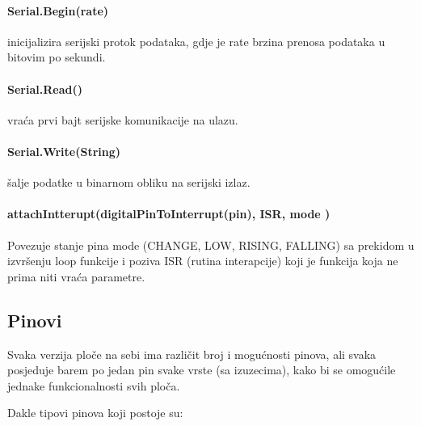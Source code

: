 \documentclass[../Document.tex]{subfiles}
\begin{document}

\paragraph{Serial.Begin(rate)} inicijalizira serijski protok podataka, gdje je rate brzina prenosa podataka u bitovim po sekundi.

\paragraph{Serial.Read()} vraća prvi bajt serijske komunikacije na ulazu.

\paragraph{Serial.Write(String)} šalje podatke u binarnom obliku na serijski izlaz.

\paragraph{attachIntterupt(digitalPinToInterrupt(pin), ISR, mode )} Povezuje stanje pina mode (CHANGE, LOW, RISING, FALLING) sa prekidom u izvršenju loop funkcije i poziva ISR (rutina interapcije) koji je funkcija koja ne prima niti vraća parametre.


\subsection{Pinovi}\label{arduinopinovi}

Svaka verzija ploče na sebi ima različit broj i mogućnosti pinova, ali svaka posjeduje barem po jedan pin svake vrste (sa izuzecima), kako bi se omogućile jednake funkcionalnosti svih ploča.

\noindent Dakle tipovi pinova koji postoje su:
\end{document}
